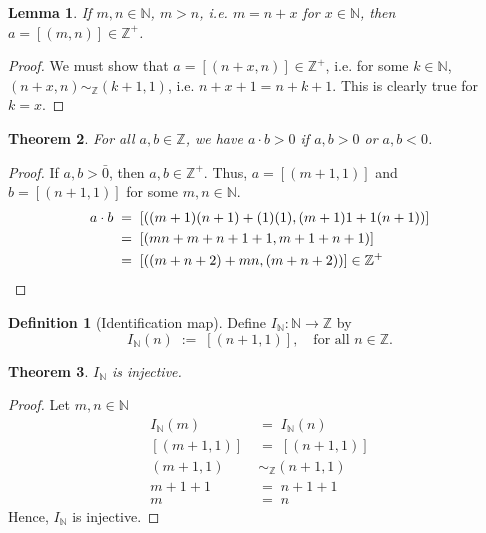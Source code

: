 \documentclass[10pt]{article}
\newtheorem{theorem}{Theorem}[section]
\newtheorem{lemma}[theorem]{Lemma}
\theoremstyle{definition}
\newtheorem*{definition}{Definition}
\theoremstyle{remark}
\newcommand{\IdN}{I_{\mathbb{N}}}
\begin{document}
        \begin{lemma}
        \label{lem:Zplus}
                If $m, n \in \mathbb{N}$, $m > n$, i.e. $m = n + x$ for $x \in \mathbb{N}$,
                then $a = [(m, n)] \in \mathbb{Z}^+$.
        \end{lemma}
        \begin{proof}
                We must show that $a = [(n + x, n)] \in \mathbb{Z}^+$, i.e.
                for some $k \in \mathbb{N}$, $(n + x, n) \sim_{\mathbb{Z}} (k + 1, 1)$, i.e.
                $n + x + 1 = n + k + 1$. This is clearly true for $k = x$.
        \end{proof}
        \begin{theorem}
                For all $a, b \in \mathbb{Z}$, we have $a\cdot b > 0$ if $a, b > 0$ or $a, b < 0$.
        \end{theorem}
        \begin{proof}
                If $a, b > \bar{0}$, then $a, b \in \mathbb{Z}^+$. Thus, $a = [(m + 1, 1)]$ and
                $b = [(n + 1, 1)]$ for some $m, n \in \mathbb{N}$.
                \begin{align*}
                        a\cdot b \;&=\; [((m + 1)(n + 1) + (1)(1), (m + 1)1 + 1(n + 1))] \\
                                \;&=\; [(mn + m + n + 1 + 1, m + 1 + n + 1)] \\
                                \;&=\; [((m + n + 2) + mn, (m + n + 2))] \in \mathbb{Z}^+ \qedhere
                \end{align*}
        \end{proof}

        \begin{definition}[Identification map]
                Define $I_\mathbb{N}\colon \mathbb{N}\to \mathbb{Z}$ by 
                \[
                        I_\mathbb{N}(n) \;:=\; [(n + 1, 1)],\quad\text{for all }n\in \mathbb{Z}.
                \]
        \end{definition}

        \begin{theorem}
                $\IdN$ is injective.
        \end{theorem}
        \begin{proof}
                Let $m, n \in \mathbb{N}$
                \begin{align*}
                        \IdN(m) \;&=\; \IdN(n) \\
                        [(m + 1, 1)] \;&=\; [(n + 1, 1)] \\
                        (m + 1, 1) &\sim_{\mathbb{Z}} (n + 1, 1) \\
                        m + 1 + 1 \;&=\; n + 1 + 1 \\
                        m \;&=\; n
                \end{align*}
                Hence, $\IdN$ is injective.
        \end{proof}
\end{document}
